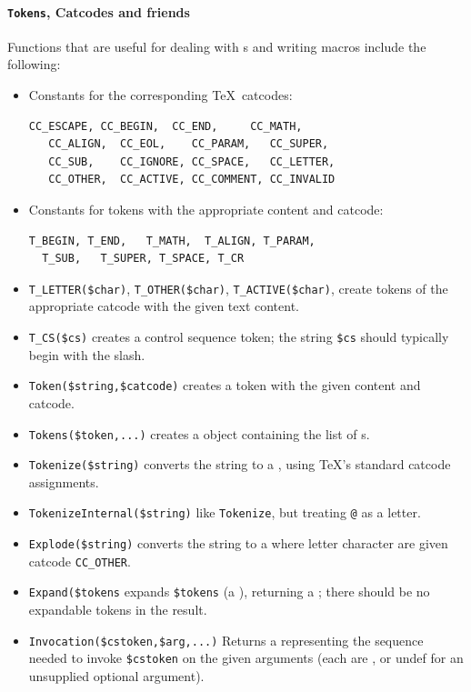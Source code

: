 \documentclass{book}
\newcommand{\ltxcode}{\lstinline[style=inlinelatexml]}
\begin{document}
\paragraph[Tokens, Catcodes,\ldots]{\texttt{Tokens}, Catcodes and friends}
Functions that are useful for dealing with s and writing macros
include the following:
\begin{itemize}
\item Constants for the corresponding \TeX\ catcodes:
\begin{lstlisting}[style=latexml]
   CC_ESCAPE, CC_BEGIN,  CC_END,     CC_MATH,
   CC_ALIGN,  CC_EOL,    CC_PARAM,   CC_SUPER,
   CC_SUB,    CC_IGNORE, CC_SPACE,   CC_LETTER,
   CC_OTHER,  CC_ACTIVE, CC_COMMENT, CC_INVALID
\end{lstlisting}
\item Constants for tokens with the appropriate content and catcode:
\begin{lstlisting}[style=latexml]
  T_BEGIN, T_END,   T_MATH,  T_ALIGN, T_PARAM,
  T_SUB,   T_SUPER, T_SPACE, T_CR
\end{lstlisting}
\item \ltxcode|T_LETTER($char)|, \ltxcode|T_OTHER($char)|, \ltxcode|T_ACTIVE($char)|,
  create tokens of the appropriate catcode with the given text content.
\item \ltxcode|T_CS($cs)| creates a control sequence token; 
  the string \ltxcode|$cs| should typically begin with the slash.
\item \ltxcode|Token($string,$catcode)| creates a token with the given content and catcode.
\item \ltxcode|Tokens($token,...)| creates a  object
   containing the list of s.
\item \ltxcode|Tokenize($string)| converts the string to a ,
   using \TeX's standard catcode assignments.
\item \ltxcode|TokenizeInternal($string)| like \texttt{Tokenize}, but
   treating \ltxcode|@| as a letter.
\item \ltxcode|Explode($string)| converts the string to a  where
   letter character are given catcode \ltxcode|CC_OTHER|.
\item \ltxcode|Expand($tokens| expands \ltxcode|$tokens| (a ), returning
  a ; there should be no expandable tokens in the result.
\item \ltxcode|Invocation($cstoken,$arg,...)| Returns a  representing
  the sequence needed to invoke \ltxcode|$cstoken| on the given arguments (each are %
  , or undef for an unsupplied optional argument).
\end{itemize}
\end{document}
